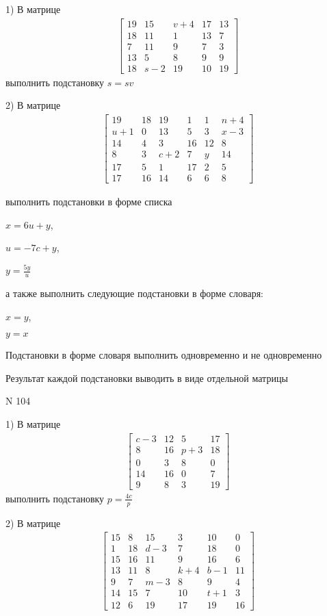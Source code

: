 \documentclass[11pt]{report}
\begin{document}
    1) В матрице
\begin{align*}
\left[\begin{matrix}19 & 15 & v + 4 & 17 & 13\\18 & 11 & 1 & 13 & 7\\7 & 11 & 9 & 7 & 3\\13 & 5 & 8 & 9 & 9\\18 & s - 2 & 19 & 10 & 19\end{matrix}\right]
\end{align*}
выполнить подстановку $s=s v$


    2) В матрице
\begin{align*}
\left[\begin{matrix}19 & 18 & 19 & 1 & 1 & n + 4\\u + 1 & 0 & 13 & 5 & 3 & x - 3\\14 & 4 & 3 & 16 & 12 & 8\\8 & 3 & c + 2 & 7 & y & 14\\17 & 5 & 1 & 17 & 2 & 5\\17 & 16 & 14 & 6 & 6 & 8\end{matrix}\right]
\end{align*}

выполнить подстановки в форме списка

$x=6 u + y$,

$u=- 7 c + y$,

$y=\frac{5 y}{u}$

а также выполнить следующие подстановки в форме словаря:

$x=y$,

$y=x$


    Подстановки в форме словаря выполнить одновременно и не одновременно


    Результат каждой подстановки выводить в виде отдельной матрицы

\newpage
N 104


    1) В матрице
\begin{align*}
\left[\begin{matrix}c - 3 & 12 & 5 & 17\\8 & 16 & p + 3 & 18\\0 & 3 & 8 & 0\\14 & 16 & 0 & 7\\9 & 8 & 3 & 19\end{matrix}\right]
\end{align*}
выполнить подстановку $p=\frac{4 c}{p}$


    2) В матрице
\begin{align*}
\left[\begin{matrix}15 & 8 & 15 & 3 & 10 & 0\\1 & 18 & d - 3 & 7 & 18 & 0\\15 & 16 & 11 & 9 & 16 & 6\\13 & 11 & 8 & k + 4 & b - 1 & 11\\9 & 7 & m - 3 & 8 & 9 & 4\\14 & 15 & 7 & 10 & t + 1 & 3\\12 & 6 & 19 & 17 & 19 & 16\end{matrix}\right]
\end{align*}
\end{document}
